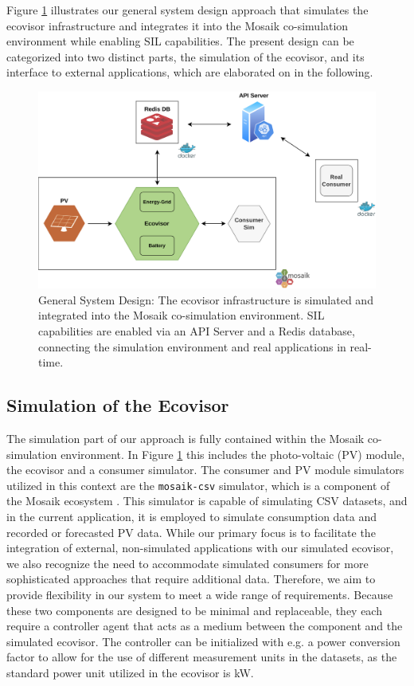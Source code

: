 Figure \ref{fig:system_design} illustrates our general system design approach
that simulates the ecovisor infrastructure and integrates it into the Mosaik
co-simulation environment while enabling SIL capabilities. The present design
can be categorized into two distinct parts, the simulation of the ecovisor, and
its interface to external applications, which are elaborated on in the
following.

\begin{figure}
    \centering
    \includegraphics[width=\linewidth]{figures/system_design}
    \caption{
        General System Design: The ecovisor infrastructure is simulated and
        integrated into the Mosaik co-simulation environment. SIL capabilities
        are enabled via an API Server and a Redis database, connecting the
        simulation environment and real applications in real-time.
    }
    \label{fig:system_design}
\end{figure}

\subsection{Simulation of the Ecovisor}
The simulation part of our approach is fully contained within the Mosaik
co-simulation environment. In Figure \ref{fig:system_design} this includes the
photo-voltaic (PV) module, the ecovisor and a consumer simulator. The consumer
and PV module simulators utilized in this context are the \texttt{mosaik-csv}
simulator, which is a component of the Mosaik ecosystem \cite{mosaik_ecosystem}.
This simulator is capable of simulating CSV datasets, and in the current
application, it is employed to simulate consumption data and recorded or
forecasted PV data. While our primary focus is to facilitate the integration of
external, non-simulated applications with our simulated ecovisor, we also
recognize the need to accommodate simulated consumers for more sophisticated
approaches that require additional data. Therefore, we aim to provide
flexibility in our system to meet a wide range of requirements. Because these
two components are designed to be minimal and replaceable, they each require a
controller agent that acts as a medium between the component and the simulated
ecovisor. The controller can be initialized with e.g. a power conversion factor
to allow for the use of different measurement units in the datasets, as the
standard power unit utilized in the ecovisor is kW.

